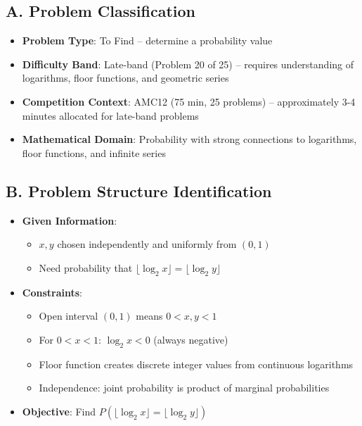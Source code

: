 \documentclass[11pt]{article}
\begin{document}
\begin{problemconfigbox}
\subsection*{A. Problem Classification}
\begin{itemize}[leftmargin=*]
    \item \textbf{Problem Type}: To Find -- determine a probability value
    \item \textbf{Difficulty Band}: Late-band (Problem 20 of 25) -- requires understanding of logarithms, floor functions, and geometric series
    \item \textbf{Competition Context}: AMC12 (75 min, 25 problems) -- approximately 3-4 minutes allocated for late-band problems
    \item \textbf{Mathematical Domain}: Probability with strong connections to logarithms, floor functions, and infinite series
\end{itemize}

\subsection*{B. Problem Structure Identification}
\begin{itemize}[leftmargin=*]
    \item \textbf{Given Information}: 
    \begin{itemize}
        \item $x, y$ chosen independently and uniformly from $(0,1)$
        \item Need probability that $\lfloor\log_2 x\rfloor = \lfloor\log_2 y\rfloor$
    \end{itemize}
    
    \item \textbf{Constraints}: 
    \begin{itemize}
        \item Open interval $(0,1)$ means $0 < x, y < 1$
        \item For $0 < x < 1$: $\log_2 x < 0$ (always negative)
        \item Floor function creates discrete integer values from continuous logarithms
        \item Independence: joint probability is product of marginal probabilities
    \end{itemize}
    
    \item \textbf{Objective}: Find $P(\lfloor\log_2 x\rfloor = \lfloor\log_2 y\rfloor)$
    

\end{itemize}
\end{problemconfigbox}
\end{document}
